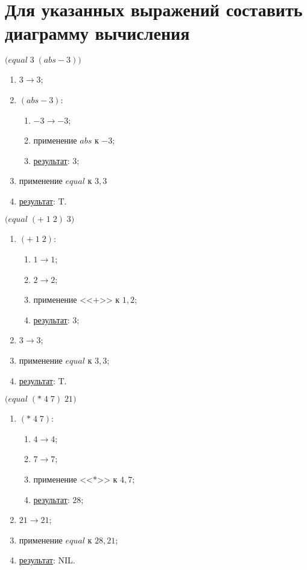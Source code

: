 
\section{Для указанных выражений составить диаграмму вычисления}

\vfill
\problem $\bigl(equal\; 3\; (abs -\!3)\bigr)$

\begin{enumerate}
	\item $3 \to 3$;
	\item $(abs -\!3)$:
	\begin{enumerate}
		\item $-3 \to -3$;
		\item применение $abs$ к $-3$;
		\item \underline{результат}: $3$;
	\end{enumerate}
	\item применение $equal$ к $3, 3$
	\item \underline{результат}: T.
\end{enumerate}
\vfill


\problem $\bigl(equal\; (+\; 1\; 2)\; 3\bigr)$

\begin{enumerate}
	\item $(+\; 1\; 2)$:
	\begin{enumerate}
		\item $1 \to 1$;
		\item $2 \to 2$;
		\item применение <<$+$>> к $1, 2$;
		\item \underline{результат}: $3$;
	\end{enumerate}
	\item $3 \to 3$;
	\item применение $equal$ к $3, 3$;
	\item \underline{результат}: T.
\end{enumerate}
\vfill


\problem $\bigl(equal\; (*\; 4\; 7)\; 21\bigr)$

\begin{enumerate}
	\item $(*\; 4\; 7)$:
	\begin{enumerate}
		\item $4 \to 4$;
		\item $7 \to 7$;
		\item применение <<$*$>> к $4, 7$;
		\item \underline{результат}: $28$;
	\end{enumerate}
	\item $21 \to 21$;
	\item применение $equal$ к $28, 21$;
	\item \underline{результат}: NIL.
\end{enumerate}


